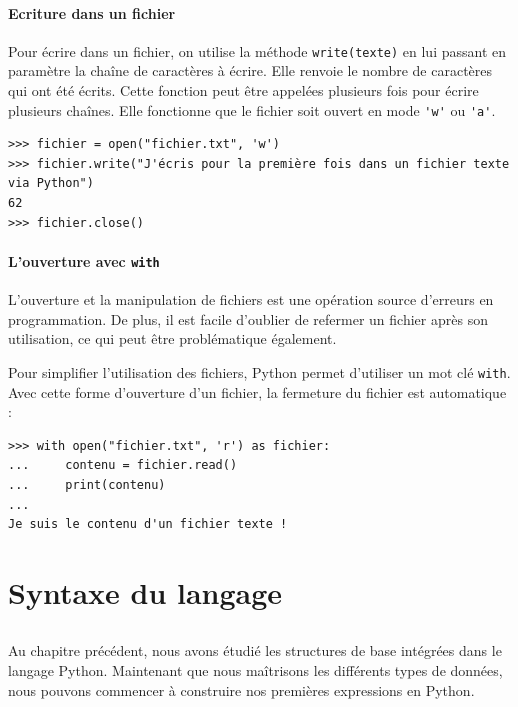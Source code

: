 \documentclass[12pt, a4paper]{article}
\begin{document}
\subsection{Ecriture dans un fichier}
Pour écrire dans un fichier, on utilise la méthode \lstinline{write(texte)} en lui passant en paramètre la chaîne de caractères à écrire. Elle renvoie le nombre de caractères qui ont été écrits. Cette fonction peut être appelées plusieurs fois pour écrire plusieurs chaînes. Elle fonctionne que le fichier soit ouvert en mode \lstinline{'w'} ou \lstinline{'a'}.
\begin{lstlisting}
>>> fichier = open("fichier.txt", 'w')
>>> fichier.write("J'écris pour la première fois dans un fichier texte via Python")
62
>>> fichier.close()
\end{lstlisting}


\subsection{L'ouverture avec \lstinline{with}}
L'ouverture et la manipulation de fichiers est une opération source d'erreurs en programmation. De plus, il est facile d'oublier de refermer un fichier après son utilisation, ce qui peut être problématique également.

Pour simplifier l'utilisation des fichiers, Python permet d'utiliser un mot clé \lstinline{with}. Avec cette forme d'ouverture d'un fichier, la fermeture du fichier est automatique :
\begin{lstlisting}
>>> with open("fichier.txt", 'r') as fichier:
...     contenu = fichier.read()
...     print(contenu)
...
Je suis le contenu d'un fichier texte !
\end{lstlisting}




%



\newpage
\part{Syntaxe du langage}
\chapter{}
Au chapitre précédent, nous avons étudié les structures de base intégrées dans le langage Python. Maintenant que nous maîtrisons les différents types de données, nous pouvons commencer à construire nos premières expressions en Python. 
\end{document}
